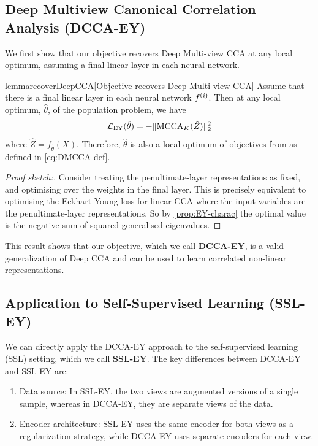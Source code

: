 \subsection{Deep Multiview Canonical Correlation Analysis (DCCA-EY)}

We first show that our objective recovers Deep Multi-view CCA at any local optimum, assuming a final linear layer in each neural network.

\begin{restatable}{lemma}{recoverDeepCCA}[Objective recovers Deep Multi-view CCA]\label{lem:recover-DeepCCA}
    Assume that there is a final linear layer in each neural network $f^{(i)}$.
    Then at any local optimum, $\hat{\theta}$, of the population problem, we have
    \begin{align*}
        \mathcal{L}_\text{EY}(\hat{\theta}) = - \lVert\operatorname{MCCA}_K(\hat{Z})\rVert_2^2
    \end{align*}
    where $\hat{Z} = f_{\hat{\theta}}(X)$.
    Therefore, $\hat{\theta}$ is also a local optimum of objectives from \citet{andrew2013deep, somandepalli2019multimodal} as defined in \cref{eq:DMCCA-def}.
\end{restatable}

\begin{proof}[Proof sketch:]
    Consider treating the penultimate-layer representations as fixed, and optimising over the weights in the final layer.
    This is precisely equivalent to optimising the Eckhart-Young loss for linear CCA where the input variables are the penultimate-layer representations.
    So by \cref{prop:EY-charac} the optimal value is the negative sum of squared generalised eigenvalues.
\end{proof}

This result shows that our objective, which we call \textbf{DCCA-EY}, is a valid generalization of Deep CCA and can be used to learn correlated non-linear representations.

\subsection{Application to Self-Supervised Learning (SSL-EY)}

We can directly apply the DCCA-EY approach to the self-supervised learning (SSL) setting, which we call \textbf{SSL-EY}. The key differences between DCCA-EY and SSL-EY are:

\begin{enumerate}
    \item Data source: In SSL-EY, the two views are augmented versions of a single sample, whereas in DCCA-EY, they are separate views of the data.
    \item Encoder architecture: SSL-EY uses the same encoder for both views as a regularization strategy, while DCCA-EY uses separate encoders for each view.
\end{enumerate}

